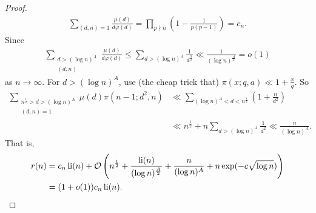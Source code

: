 \documentclass{article}
\newcommand{\1}{\mathbbm{1}}
\newcommand{\bigO}{\mathcal{O}}
\DeclareMathOperator\li{li}
\begin{document}
\begin{enumerate}
\begin{proof}
\begin{align*}
        \sum_{(d,n) = 1} \frac{\mu(d)}{d \varphi(d)} = \prod_{p \nmid n} \left(1 - \frac{1}{p(p-1)}\right) = c_n.
      \end{align*}
      Since
      \begin{align*}
        \sum_{\substack{d > (\log n)^A \\ (d,n)}} \frac{\mu(d)}{d \varphi(d)} \leq \sum_{d > (\log n)^A} \frac{1}{d^{\frac 32}} \ll \frac{1}{(\log n)^{\frac A2}} = o(1)
      \end{align*}
      as $n \to \infty$.
      For $d > (\log n)^A$, use (the cheap trick that) $\pi(x;q,a) \ll 1 + \frac{x}{q}$.
      So
      \begin{align*}
        \sum_{\substack{n^{\frac 12} > d > (\log n)^A \\ (d,n)=1}} \mu(d) \pi(n-1;d^2,n) &\ll \sum_{(\log n)^A < d < n^{\frac 12}} (1 + \frac{n}{d^2}) \\
                                                                                         &\ll n^{\frac 12} + n \sum_{d > (\log n)^A} \frac{1}{d^2} \ll \frac{n}{(\log n)^A}.
      \end{align*}
      That is,
      \begin{align*}
        r(n) &= c_n \li(n) + \bigO\left(n^{\frac 12} + \frac{\li(n)}{(\log n)^{\frac A2}} + \frac{n}{(\log n)^A} + n \exp(-c \sqrt{\log n})\right) \\&= (1 + o(1)) c_n \li(n). \qedhere
      \end{align*}
    \end{proof}
\end{enumerate}

\clearpage
\printnomenclature
\printindex
\end{document}
